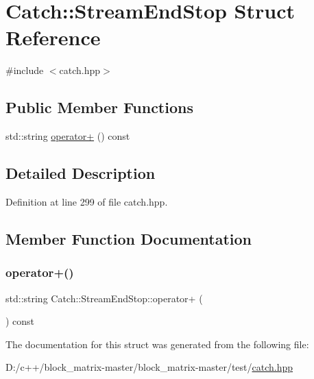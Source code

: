 \hypertarget{struct_catch_1_1_stream_end_stop}{}\section{Catch\+:\+:Stream\+End\+Stop Struct Reference}
\label{struct_catch_1_1_stream_end_stop}


{\ttfamily \#include $<$catch.\+hpp$>$}

\subsection*{Public Member Functions}
\begin{DoxyCompactItemize}
\item 
std\+::string \mbox{\hyperlink{struct_catch_1_1_stream_end_stop_a4a518f0342a381074821d5bda2651401}{operator+}} () const
\end{DoxyCompactItemize}


\subsection{Detailed Description}


Definition at line 299 of file catch.\+hpp.



\subsection{Member Function Documentation}
\mbox{\label{struct_catch_1_1_stream_end_stop_a4a518f0342a381074821d5bda2651401}} 
\subsubsection{\texorpdfstring{operator+()}{operator+()}}
{\footnotesize\ttfamily std\+::string Catch\+::\+Stream\+End\+Stop\+::operator+ (\begin{DoxyParamCaption}{ }\end{DoxyParamCaption}) const}



The documentation for this struct was generated from the following file\+:\begin{DoxyCompactItemize}
\item 
D\+:/c++/block\+\_\+matrix-\/master/block\+\_\+matrix-\/master/test/\mbox{\hyperlink{catch_8hpp}{catch.\+hpp}}\end{DoxyCompactItemize}

